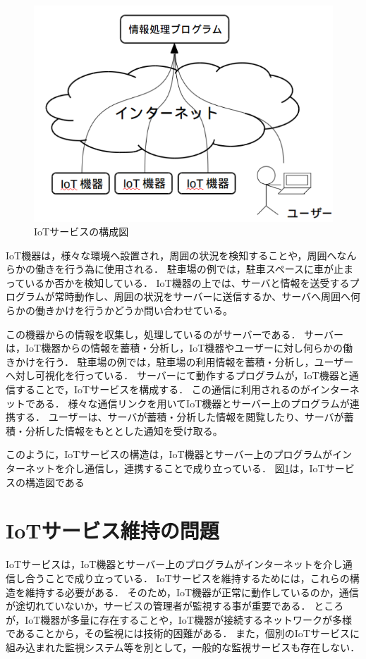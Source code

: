 \begin{figure}[htbp]
\includegraphics[width=14cm]{images/IoTservice.png}
\caption{IoTサービスの構成図}
\label{fig:IoTservice}
\end{figure}

IoT機器は，様々な環境へ設置され，周囲の状況を検知することや，周囲へなんらかの働きを行う為に使用される．
駐車場の例では，駐車スペースに車が止まっているか否かを検知している．
IoT機器の上では、サーバと情報を送受するプログラムが常時動作し、周囲の状況をサーバーに送信するか、サーバへ周囲へ何らかの働きかけを行うかどうか問い合わせている。
\medskip


この機器からの情報を収集し，処理しているのがサーバーである．
サーバーは，IoT機器からの情報を蓄積・分析し，IoT機器やユーザーに対し何らかの働きかけを行う．
駐車場の例では，駐車場の利用情報を蓄積・分析し，ユーザーへ対し可視化を行っている．
サーバーにて動作するプログラムが，IoT機器と通信することで，IoTサービスを構成する．
この通信に利用されるのがインターネットである．
様々な通信リンクを用いてIoT機器とサーバー上のプログラムが連携する．
\medskip
ユーザーは、サーバが蓄積・分析した情報を閲覧したり、サーバが蓄積・分析した情報をもととした通知を受け取る。

このように，IoTサービスの構造は，IoT機器とサーバー上のプログラムがインターネットを介し通信し，連携することで成り立っている．
図\ref{fig:IoTservice}は，IoTサービスの構造図である

\section{IoTサービス維持の問題}
IoTサービスは，IoT機器とサーバー上のプログラムがインターネットを介し通信し合うことで成り立っている．
IoTサービスを維持するためには，これらの構造を維持する必要がある．
そのため，IoT機器が正常に動作しているのか，通信が途切れていないか，サービスの管理者が監視する事が重要である．
ところが，IoT機器が多量に存在することや，IoT機器が接続するネットワークが多様であることから，その監視には技術的困難がある．
また，個別のIoTサービスに組み込まれた監視システム等を別として，一般的な監視サービスも存在しない．
\medskip

